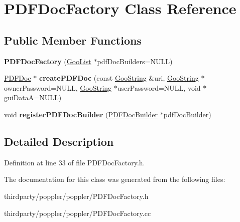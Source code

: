 \hypertarget{class_p_d_f_doc_factory}{}\section{P\+D\+F\+Doc\+Factory Class Reference}
\label{class_p_d_f_doc_factory}
\subsection*{Public Member Functions}
\begin{DoxyCompactItemize}
\item 
\mbox{\label{class_p_d_f_doc_factory_a22f219640c87e50558824a3e8ac115c2}} 
{\bfseries P\+D\+F\+Doc\+Factory} (\hyperlink{class_goo_list}{Goo\+List} $\ast$pdf\+Doc\+Builders=N\+U\+LL)
\item 
\mbox{\label{class_p_d_f_doc_factory_ae996f03c8d1cee59a2404d6b01cedc7a}} 
\hyperlink{class_p_d_f_doc}{P\+D\+F\+Doc} $\ast$ {\bfseries create\+P\+D\+F\+Doc} (const \hyperlink{class_goo_string}{Goo\+String} \&uri, \hyperlink{class_goo_string}{Goo\+String} $\ast$owner\+Password=N\+U\+LL, \hyperlink{class_goo_string}{Goo\+String} $\ast$user\+Password=N\+U\+LL, void $\ast$gui\+DataA=N\+U\+LL)
\item 
\mbox{\label{class_p_d_f_doc_factory_acc41d822df4df428ed21d55ce16a6a58}} 
void {\bfseries register\+P\+D\+F\+Doc\+Builder} (\hyperlink{class_p_d_f_doc_builder}{P\+D\+F\+Doc\+Builder} $\ast$pdf\+Doc\+Builder)
\end{DoxyCompactItemize}


\subsection{Detailed Description}


Definition at line 33 of file P\+D\+F\+Doc\+Factory.\+h.



The documentation for this class was generated from the following files\+:\begin{DoxyCompactItemize}
\item 
thirdparty/poppler/poppler/P\+D\+F\+Doc\+Factory.\+h\item 
thirdparty/poppler/poppler/P\+D\+F\+Doc\+Factory.\+cc\end{DoxyCompactItemize}
